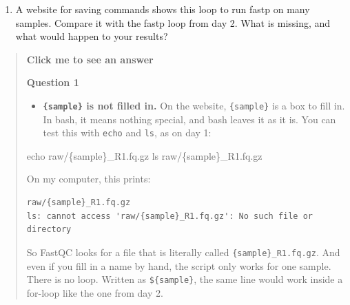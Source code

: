 \documentclass[
  letterpaper,
  DIV=11,
  numbers=noendperiod]{scrreprt}
\newenvironment{Shaded}{}{}
\newcommand{\AttributeTok}[1]{\textcolor[rgb]{0.84,0.23,0.29}{#1}}
\newcommand{\BuiltInTok}[1]{\textcolor[rgb]{0.84,0.23,0.29}{#1}}
\newcommand{\ControlFlowTok}[1]{\textcolor[rgb]{0.84,0.23,0.29}{#1}}
\newcommand{\ExtensionTok}[1]{\textcolor[rgb]{0.84,0.23,0.29}{\textbf{#1}}}
\newcommand{\FunctionTok}[1]{\textcolor[rgb]{0.44,0.26,0.76}{#1}}
\newcommand{\KeywordTok}[1]{\textcolor[rgb]{0.84,0.23,0.29}{#1}}
\newcommand{\NormalTok}[1]{\textcolor[rgb]{0.14,0.16,0.18}{#1}}
\newcommand{\VariableTok}[1]{\textcolor[rgb]{0.89,0.38,0.04}{#1}}
\providecommand{\tightlist}{%
  \setlength{\itemsep}{0pt}\setlength{\parskip}{0pt}}
\begin{document}
\begin{tcolorbox}
\begin{enumerate}
\def\labelenumi{\arabic{enumi}.}
\setcounter{enumi}{1}
\tightlist
\item
  A website for saving commands shows this loop to run fastp on many
  samples. Compare it with the fastp loop from day 2. What is missing,
  and what would happen to your results?
\end{enumerate}

\begin{Shaded}
\end{Shaded}

\begin{quote}
\textbf{Click me to see an answer}

\textbf{Question 1}

\begin{itemize}
\tightlist
\item
  \textbf{\texttt{\{sample\}} is not filled in.} On the website,
  \texttt{\{sample\}} is a box to fill in. In bash, it means nothing
  special, and bash leaves it as it is. You can test this with
  \texttt{echo} and \texttt{ls}, as on day 1:
\end{itemize}

\begin{Shaded}
\begin{Highlighting}[]
\BuiltInTok{echo}\NormalTok{ raw/\{sample\}\_R1.fq.gz}
\FunctionTok{ls}\NormalTok{ raw/\{sample\}\_R1.fq.gz}
\end{Highlighting}
\end{Shaded}

On my computer, this prints:

\begin{verbatim}
raw/{sample}_R1.fq.gz
ls: cannot access 'raw/{sample}_R1.fq.gz': No such file or directory
\end{verbatim}

So FastQC looks for a file that is literally called
\texttt{\{sample\}\_R1.fq.gz}. And even if you fill in a name by hand,
the script only works for one sample. There is no loop. Written as
\texttt{\$\{sample\}}, the same line would work inside a for-loop like
the one from day 2.


\end{quote}
\end{tcolorbox}
\end{document}
